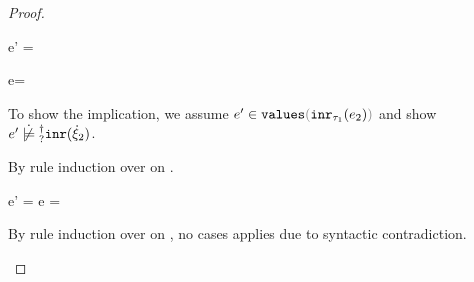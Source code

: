 \begin{proof}
\begin{byCases}
\begin{byCases}
\begin{byCases}
\begin{byCases}
                \item[\text{(\ref{rule:IVInl})}]
                  \begin{pfsteps}
                  \item e' =  
                  \item {} 
                  \end{pfsteps}

              \end{byCases}

            \item[\text{(\ref{rule:VInr}, \ref{rule:TInr})}]
              \begin{pfsteps}
              \item e= 
              \item {}  
              \item {}  
              \item {}  
              \end{pfsteps}
              To show the implication, we assume $\inValues{e'}{\hinr{\tau_1}{e_2}}$ and show $\cnotsatisfyormay{e'}{\cinr{\hxi_2}}$.
              \begin{pfsteps}
              \item {}  
              \end{pfsteps}
              By rule induction over  on .
              \begin{byCases}
                \item[\text{(\ref{rule:IVVal})}]
                \begin{pfsteps}
                \item e' = e =  
                \item {} 
                \end{pfsteps}

                \item[\text{(\ref{rule:IVIndet})}]
                  \begin{pfsteps}
                  \item {}  
                  \end{pfsteps}
                  By rule induction over  on
                  , no cases applies due to syntactic contradiction.


\end{byCases}
\end{byCases}
\end{byCases}
\end{byCases}
\end{proof}
